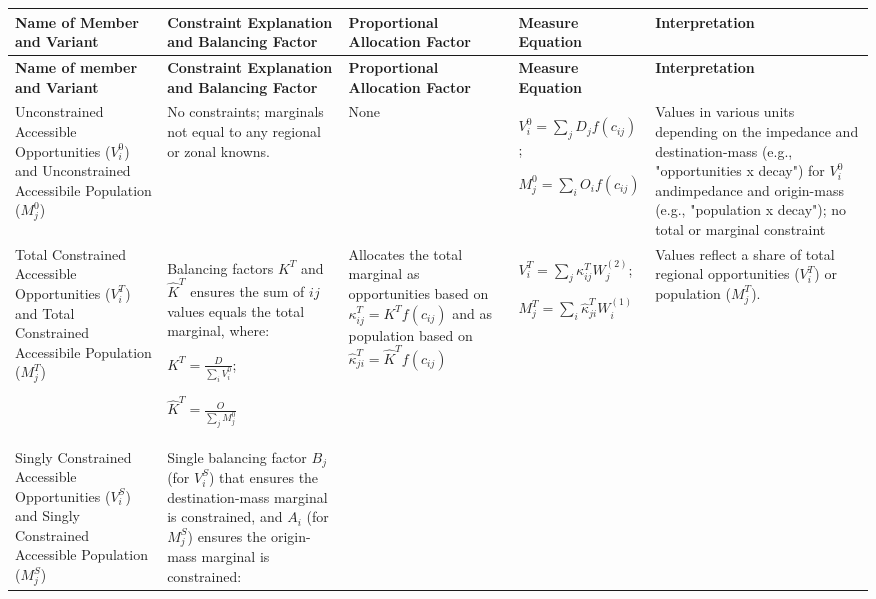 {\tiny
\begin{longtable}{|p{2.5cm}|p{2.5cm}|p{2.5cm}|p{3cm}|p{3cm}|}
\hline
\textbf{Name of Member and Variant} & \textbf{Constraint Explanation and Balancing Factor} & \textbf{Proportional Allocation Factor} & \textbf{Measure Equation} & \textbf{Interpretation} \\
\hline
\endfirsthead

\hline
\textbf{Name of member and Variant} & \textbf{Constraint Explanation and Balancing Factor} & \textbf{Proportional Allocation Factor} & \textbf{Measure Equation} & \textbf{Interpretation} \\
\hline
\endhead

Unconstrained Accessible Opportunities ($V_i^0$) and Unconstrained Accessibile Population ($M_j^0$)
& No constraints; marginals not equal to any regional or zonal knowns.
& None
& $V_i^0 = \sum_j D_j f(c_{ij})$;

$M_j^0 = \sum_i O_i f(c_{ij})$

& Values in various units depending on the impedance and destination-mass (e.g., "opportunities x decay") for $V_i^0$ andimpedance and origin-mass (e.g., "population x decay"); no total or marginal constraint \\
\hline

Total Constrained Accessible Opportunities ($V_i^T$) and Total Constrained Accessibile Population ($M_j^T$)
& Balancing factors $K^T$ and $\hat{K}^T$ ensures the sum of $ij$ values equals the total marginal, where:

$K^T = \frac{D}{\sum_i V_i^0}$;

$\hat{K}^T = \frac{O}{\sum_j M_j^0}$

& Allocates the total marginal as opportunities based on $\kappa_{ij}^T = K^T f(c_{ij})$ and as population based on  $\hat{\kappa}_{ji}^T = \hat K^T f(c_{ij})$

& $V^T_i =  \sum_j \kappa_{ij}^T W^{(2)}_j$;

$M_j^T =  \sum_i \hat{\kappa}_{ji}^T W^{(1)}_i$


& Values reflect a share of total regional opportunities ($V^T_i$) or population ($M^T_j$). \\
\hline

Singly Constrained Accessible Opportunities ($V_i^S$) and Singly Constrained Accessible Population ($M_j^S$)
& Single balancing factor $B_j$ (for $V_i^S$) that ensures the destination-mass marginal is constrained, and $A_i$ (for $M_j^S$) ensures the origin-mass marginal is constrained:


\end{longtable}}
